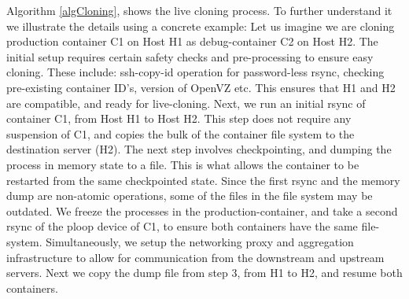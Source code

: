Algorithm \ref{algCloning}, shows the live cloning process. To further understand it we illustrate the details using a concrete example:
Let us imagine we are cloning production container C1 on Host H1 as debug-container C2 on Host H2. 
The initial setup requires certain safety checks and pre-processing to ensure easy cloning. 
These include: ssh-copy-id operation for password-less rsync, checking pre-existing container ID's, version of OpenVZ etc. 
This ensures that H1 and H2 are compatible, and ready for live-cloning.
Next, we run an initial rsync of container C1, from Host H1 to Host H2. 
This step does not require any suspension of C1, and copies the bulk of the container file system to the destination server (H2). 
The next step involves checkpointing, and dumping the process in memory state to a file.
This is what allows the container to be restarted from the same checkpointed state. 
Since the first rsync and the memory dump are non-atomic operations, some of the files in the file system may be outdated.
We freeze the processes in the production-container, and take a second rsync of the ploop device of C1, to ensure both containers have the same file-system. 
Simultaneously, we setup the networking proxy and aggregation infrastructure to allow for communication from the downstream and upstream servers.
Next we copy the dump file from step 3, from H1 to H2, and resume both containers.

